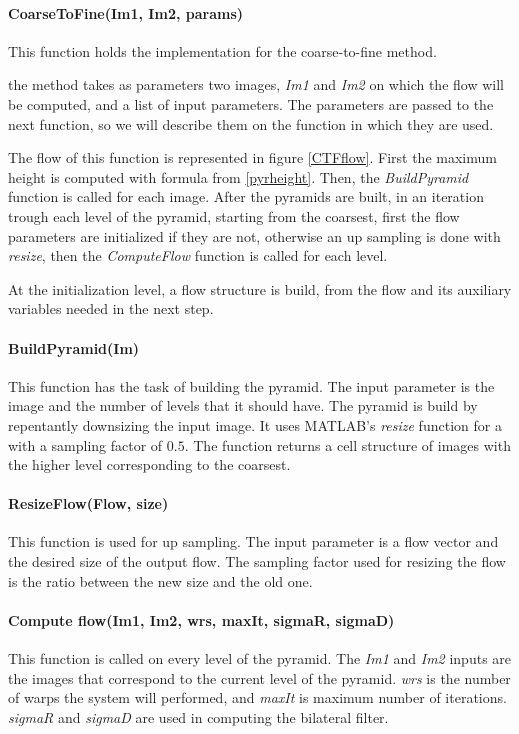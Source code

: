 \documentclass[12pt,a4paper,twoside]{report}
\begin{document}
{\paragraph{CoarseToFine(Im1, Im2, params)} This function holds the implementation for the coarse-to-fine method. 

the method takes as parameters two images, \textit{Im1} and \textit{Im2} on which the flow will be computed, and a list of input parameters. The parameters are passed to the next function, so we will describe them on the function in which they are used. 

The flow of this function is represented in figure \ref{CTFflow}. First the maximum height is computed with formula from \ref{pyrheight}. Then, the \textit{BuildPyramid} function is called for each image. After the pyramids are built, in an iteration trough each level of the pyramid, starting from the coarsest, first the flow parameters are initialized if they are not, otherwise an up sampling is done with \textit{resize}, then the \textit{ComputeFlow} function is called for each level. 

At the initialization level, a flow structure is build, from the flow and its auxiliary variables needed in the next step.

\paragraph{BuildPyramid(Im)} This function has the task of building the pyramid. The input parameter is the image and the number of levels that it should have. The pyramid is build by repentantly downsizing the input image. It uses  MATLAB's \textit{resize} function for a with a sampling factor of $0.5$. The function returns a cell structure of images with the higher level corresponding to the coarsest.

\paragraph{ResizeFlow(Flow, size)}
This function is used for up sampling. The input parameter is a flow vector and the desired size of the output flow. The sampling factor used for resizing the flow is the ratio between the new size and the old one. 

\paragraph{Compute flow(Im1, Im2, wrs, maxIt, sigmaR, sigmaD)} This function is called on every level of the pyramid. The \textit{Im1} and \textit{Im2} inputs are the images that correspond to the current level of the pyramid. \textit{wrs} is the number of warps the system will performed, and \textit{maxIt} is maximum number of iterations. \textit{sigmaR} and \textit{sigmaD} are used in computing the bilateral filter.

}
\end{document}
